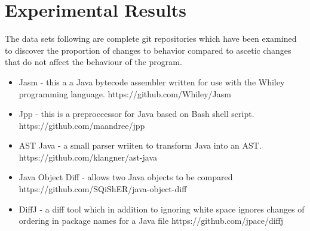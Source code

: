 
\chapter{Experimental Results}

The data sets following are complete git repositories which have been examined to discover the proportion of changes to behavior compared to ascetic changes that do not affect the behaviour of the program. 

% 
% 

\begin{itemize}
  \item Jasm - this a a Java bytecode assembler written for use with the Whiley programming language. https://github.com/Whiley/Jasm
  \item Jpp - this is a preproccessor for Java based on Bash shell script. https://github.com/maandree/jpp
  \item AST Java - a small parser wriiten to transform Java into an AST. https://github.com/klangner/ast-java
  \item Java Object Diff - allows two Java objects to be compared https://github.com/SQiShER/java-object-diff
  \item DiffJ - a diff tool which in addition to ignoring white space ignores changes of ordering in package names for a Java file https://github.com/jpace/diffj
\end{itemize}

% 


% 

